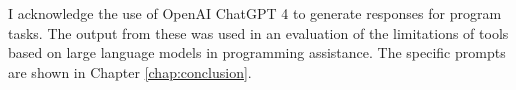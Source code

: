 \documentclass[
11pt, %
english, %
singlespacing, %
headsepline, %
]{MastersDoctoralThesis} %
\begin{document}


\begin{acknowledgements}
\addchaptertocentry{\acknowledgementname} %
I acknowledge the use of OpenAI ChatGPT 4 to generate responses for program tasks. The output from these was used in an evaluation of the limitations of tools based on large language models in programming assistance. The specific prompts are shown in Chapter \ref{chap:conclusion}.
\end{acknowledgements}


\tableofcontents %

\listoffigures %

\listoftables %



\end{document}
